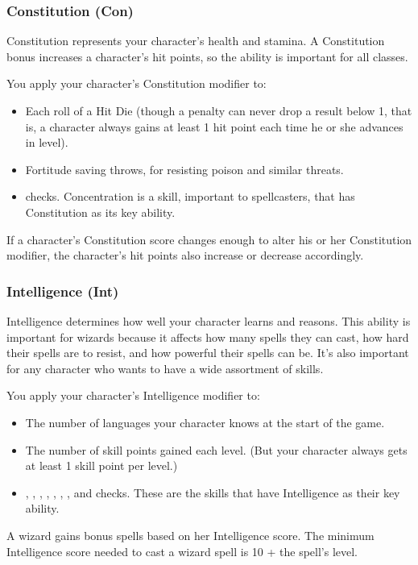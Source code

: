 \subsubsection{Constitution (Con)}

Constitution represents your character's health and stamina. A Constitution bonus 
increases a character's hit points, so the ability is important for all classes.

You apply your character's Constitution modifier to:
\begin{itemize}
\item Each roll of a Hit Die (though a penalty can never drop a result below 1, that 
is, a character always gains at least 1 hit point each time he or she advances 
in level).
\item Fortitude saving throws, for resisting poison and similar threats.
\item {} checks. Concentration is a skill, important to spellcasters, that 
has Constitution as its key ability.
\end{itemize}
If a character's Constitution score changes enough to alter his or her Constitution 
modifier, the character's hit points also increase or decrease accordingly.

\subsubsection{Intelligence (Int)}

Intelligence determines how well your character learns and reasons. This ability 
is important for wizards because it affects how many spells they can cast, how 
hard their spells are to resist, and how powerful their spells can be. It's also 
important for any character who wants to have a wide assortment of skills.

You apply your character's Intelligence modifier to:
\begin{itemize}
\item The number of languages your character knows at the start of the game.
\item The number of skill points gained each level. (But your character always gets at 
least 1 skill point per level.)
\item {}, , , , , , , and 
 checks. These are the skills that have Intelligence as their key ability.
\end{itemize}
A wizard gains bonus spells based on her Intelligence score. The minimum Intelligence 
score needed to cast a wizard spell is 10 + the spell's level. 

